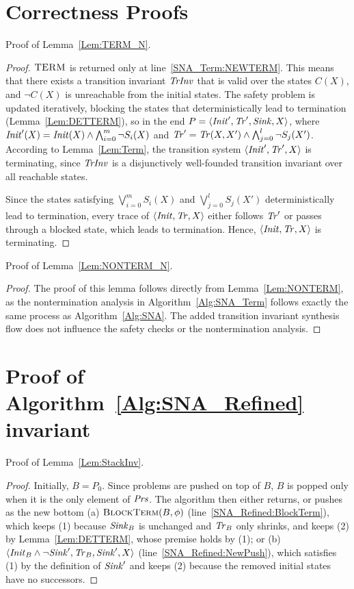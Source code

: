 \section{Correctness Proofs} \label{App:proofs_correctness}

Proof of Lemma~\ref{Lem:TERM_N}.

\begin{proof}
    $\textsc{TERM}$ is returned only at line~\ref{SNA_Term:NEWTERM}.
    This means that there exists a transition invariant $\mathit{TrInv}$ that is valid over the states $C(X)$, and $\lnot C(X)$ is
    unreachable from the initial states.
    The safety problem is updated iteratively, blocking the states that deterministically lead to termination (Lemma~\ref{Lem:DETTERM}),
    so in the end $P = \langle \mathit{Init}', \mathit{Tr}', \mathit{Sink}, X \rangle$, where $\mathit{Init}'(X) = \mathit{Init}(X) \land \bigwedge_{i=0}^{m} \lnot S_i(X)$
    and $\mathit{Tr}' = \mathit{Tr}(X,X') \land \bigwedge_{j=0}^{l} \lnot S_j(X')$.
    According to Lemma~\ref{Lem:Term}, the transition system $\langle \mathit{Init}', \mathit{Tr}', X \rangle$ is terminating, since $\mathit{TrInv}$ is a disjunctively well-founded transition invariant over all reachable states.

    Since the states satisfying $\bigvee_{i=0}^{m} S_i(X)$ and $\bigvee_{j=0}^{l} S_j(X')$ deterministically lead to termination,
    every trace of $\langle \mathit{Init}, \mathit{Tr}, X \rangle$ either follows $\mathit{Tr}'$ or passes through a blocked state, which leads to termination.
    Hence, $\langle \mathit{Init}, \mathit{Tr}, X \rangle$ is terminating.
\end{proof}


Proof of Lemma~\ref{Lem:NONTERM_N}.


\begin{proof}
    The proof of this lemma follows directly from Lemma~\ref{Lem:NONTERM}, 
    as the nontermination analysis in Algorithm~\ref{Alg:SNA_Term} 
    follows exactly the same process as Algorithm~\ref{Alg:SNA}.
    The added transition invariant synthesis flow does not influence the safety checks or the nontermination analysis.
\end{proof}

\section{Proof of Algorithm~\ref{Alg:SNA_Refined} invariant}\label{App:invariant}

Proof of Lemma~\ref{Lem:StackInv}.
\begin{proof}
    Initially, $B = P_0$. Since problems are pushed on top of $B$, $B$ is popped only when it is the only element of $\mathit{Prs}$.
    The algorithm then either returns, or pushes as the new bottom
    (a) $\textsc{BlockTerm}(B, \phi)$ (line~\ref{SNA_Refined:BlockTerm}), which keeps (1) because $\mathit{Sink}_B$ is unchanged and $\mathit{Tr}_B$ only shrinks,
    and keeps (2) by Lemma~\ref{Lem:DETTERM}, whose premise holds by (1); or
    (b) $\langle \mathit{Init}_B \land \lnot \mathit{Sink}', \mathit{Tr}_B, \mathit{Sink}', X \rangle$ (line~\ref{SNA_Refined:NewPush}), which satisfies (1) by the definition of $\mathit{Sink}'$
    and keeps (2) because the removed initial states have no successors.
\end{proof}


